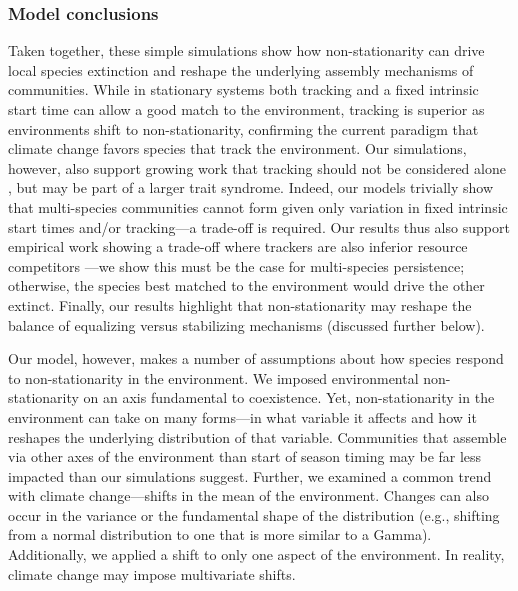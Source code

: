 \documentclass[11pt,letterpaper]{article}
\begin{document}
\subsubsection{Model conclusions}

Taken together, these simple simulations show how non-stationarity can drive local species extinction and reshape the underlying assembly mechanisms of communities. While in stationary systems both tracking and a fixed intrinsic start time can allow a good match to the environment, tracking is superior as environments shift to non-stationarity, confirming the current paradigm that climate change favors species that track the environment. Our simulations, however, also support growing work that tracking should not be considered alone \citep{Diamond:2011nx,Dorji2013,Ishioka2013,kharouba2014,du2017}, but may be part of a larger trait syndrome. Indeed, our models trivially show that multi-species communities cannot form given only variation in fixed intrinsic start times and/or tracking---a trade-off is required. Our results thus also support empirical work showing a trade-off where trackers are also inferior resource competitors \citep{lasky2016,Zhu2016BioLetters}---we show this must be the case for multi-species persistence; otherwise, the species best matched to the environment would drive the other extinct. Finally, our results highlight that non-stationarity may reshape the balance of equalizing versus stabilizing mechanisms (discussed further below). 

Our model, however, makes a number of assumptions about how species respond to non-stationarity in the environment. We imposed environmental non-stationarity on an axis fundamental to coexistence. Yet, non-stationarity in the environment can take on many forms---in what variable it affects and how it reshapes the underlying distribution of that variable. Communities that assemble via other axes of the environment than start of season timing may be far less impacted than our simulations suggest. Further, we examined a common trend with climate change---shifts in the mean of the environment. Changes can also occur in the variance or the fundamental shape of the distribution (e.g., shifting from a normal distribution to one that is more similar to a Gamma). Additionally, we applied a shift to only one aspect of the environment. In reality, climate change may impose multivariate shifts.
\end{document}
